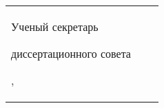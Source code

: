 
\vspace{0.008\paperheight plus1fill}
\noindent%
\begin{tabularx}{\textwidth}{@{}%
>{\raggedright\arraybackslash}b{18em}@{}
>{\centering\arraybackslash}X
r
@{}}
    Ученый секретарь\par
    диссертационного совета\par
    ,\par
    &
\end{tabularx}
